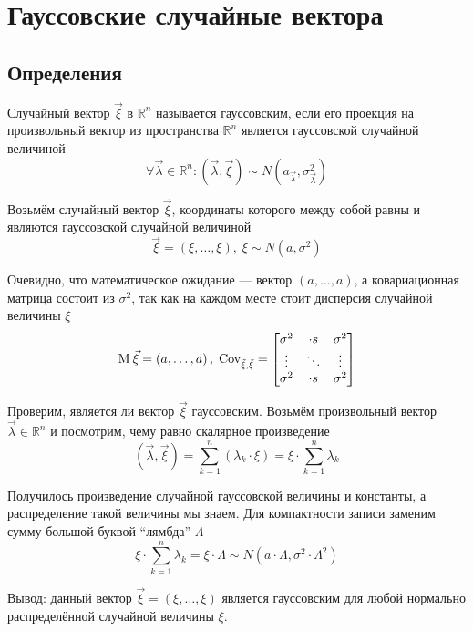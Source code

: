 \section{Гауссовские случайные вектора}

\subsection{Определения}
\begin{definition}
  \label{def:gaussianVector}
  Случайный вектор $\vec{\xi}$ в $\mathbb{R}^n$ называется гауссовским, если
  его проекция на произвольный вектор из пространства $\mathbb{R}^n$
  является гауссовской случайной величиной
  $$\forall \vec{\lambda} \in \mathbb{R}^n:
      \left( \vec{\lambda}, \vec{\xi} \right)
      \sim N\left( a_{\vec{\lambda}}, \sigma_{\vec{\lambda}}^2 \right)$$
\end{definition}

\begin{example}\label{ex:gaussVectorsIntro}
  Возьмём случайный вектор $\vec{\xi}$, координаты которого между собой равны
  и являются гауссовской случайной величиной
  $$\vec{\xi} = \left( \xi, \dots, \xi \right),\;
      \xi \sim N\left( a, \sigma^2 \right)$$

  Очевидно, что математическое ожидание --- вектор
  $\left( a, \dots, a \right)$, а ковариационная матрица состоит из
  $\sigma^2$, так как на каждом месте стоит дисперсия случайной величины $\xi$
  $$\operatorname{M}_{} \vec{\xi} = \left( a, \dots, a \right),\;
      \operatorname{Cov^{}_{\vec{\xi}, \vec{\xi}}} =
      \begin{bmatrix}
      \sigma^2 & \cdot s & \sigma^2 \\
      \vdots & \ddots & \vdots \\
      \sigma^2 & \cdot s & \sigma^2
      \end{bmatrix}$$

  Проверим, является ли вектор $\vec{\xi}$ гауссовским.
  Возьмём произвольный вектор $\vec{\lambda} \in \mathbb{R}^n$
  и посмотрим, чему равно скалярное произведение
  $$\left( \vec{\lambda}, \vec{\xi} \right)
      = \sum_{k=1}^{n} \left( \lambda_k \cdot \xi \right)
      = \xi \cdot \sum_{k=1}^{n} \lambda_k$$

  Получилось произведение случайной гауссовской величины и константы,
  а распределение такой величины мы знаем. Для компактности записи
  заменим сумму большой буквой ``лямбда'' $\Lambda$
  $$\xi \cdot \sum_{k=1}^{n} \lambda_k
      = \xi \cdot \Lambda \sim N\left( a \cdot \Lambda,
      \sigma^2 \cdot \Lambda^2 \right)$$

  Вывод: данный вектор $\vec{\xi}= \left( \xi, \dots, \xi \right)$ является
  гауссовским для любой нормально распределённой случайной величины $\xi$.
\end{example}


